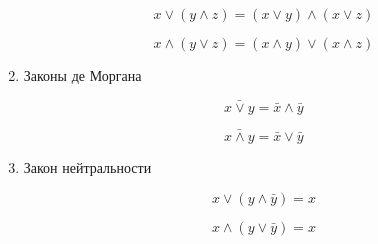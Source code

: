 \begin{enumerate}
  \begin{minipage}{5cm}
     $$x \vee (y \wedge z) = (x \vee y) \wedge (x \vee z)$$
  \end{minipage}
  \begin{minipage}{5cm}
     $$x \wedge (y \vee z) = (x \wedge y) \vee (x \wedge z)$$
  \end{minipage}
  \item Законы де Моргана \\
  \begin{minipage}{5cm}
     $$\bar{x \vee y} = \bar{x} \wedge \bar{y}$$
  \end{minipage}
  \begin{minipage}{5cm}
     $$\bar{x \wedge y} = \bar{x} \vee \bar{y}$$
  \end{minipage}
  \item Закон нейтральности \\
  \begin{minipage}{5cm}
     $$x \vee (y \wedge \bar{y}) = x$$
  \end{minipage}
  \begin{minipage}{5cm}
     $$x \wedge (y \vee \bar{y}) = x$$
  \end{minipage}
\end{enumerate}

